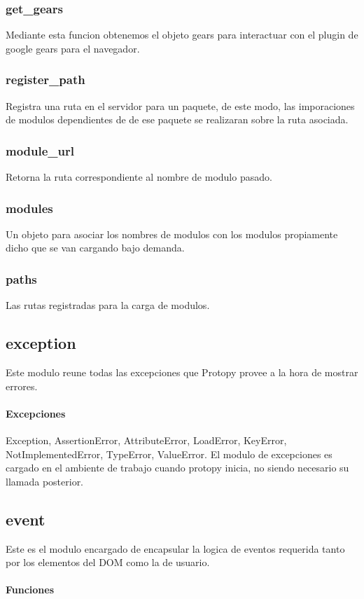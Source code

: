 \subsubsection*{get\_gears}
Mediante esta funcion obtenemos el objeto gears para interactuar con el plugin
de google gears para el navegador.
\subsubsection*{register\_path}
Registra una ruta en el servidor para un paquete, de este modo, las imporaciones
de modulos dependientes de de ese paquete se realizaran sobre la ruta asociada. 
\subsubsection*{module\_url}
Retorna la ruta correspondiente al nombre de modulo pasado.
\subsubsection*{modules}
Un objeto para asociar los nombres de modulos con los modulos propiamente dicho
que se van cargando bajo demanda.
\subsubsection*{paths}
Las rutas registradas para la carga de modulos.

\subsection{exception}
Este modulo reune todas las excepciones que Protopy provee a la hora de mostrar
errores.
\paragraph{Excepciones}
Exception, AssertionError, AttributeError, LoadError, KeyError,
NotImplementedError, TypeError, ValueError.
El modulo de excepciones es cargado en el ambiente de trabajo cuando protopy
inicia, no siendo necesario su llamada posterior.

\subsection{event}
Este es el modulo encargado de encapsular la logica de eventos requerida tanto por los elementos del DOM como la de usuario.

\paragraph{Funciones}
